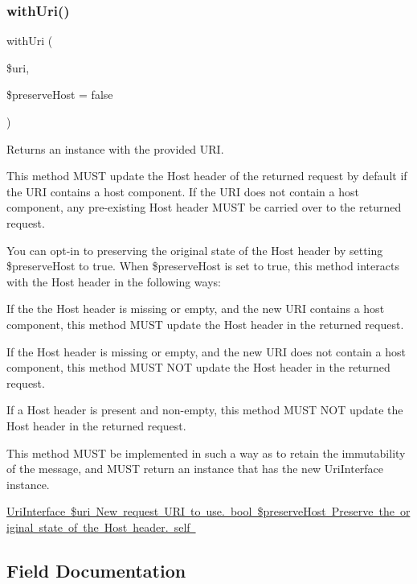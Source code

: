 \subsubsection{\texorpdfstring{with\+Uri()}{withUri()}}
{\footnotesize\ttfamily with\+Uri (\begin{DoxyParamCaption}\item[{Uri\+Interface}]{\$uri,  }\item[{}]{\$preserve\+Host = {\ttfamily false} }\end{DoxyParamCaption})}

Returns an instance with the provided U\+RI.

This method M\+U\+ST update the Host header of the returned request by default if the U\+RI contains a host component. If the U\+RI does not contain a host component, any pre-\/existing Host header M\+U\+ST be carried over to the returned request.

You can opt-\/in to preserving the original state of the Host header by setting {\ttfamily \$preserve\+Host} to {\ttfamily true}. When {\ttfamily \$preserve\+Host} is set to {\ttfamily true}, this method interacts with the Host header in the following ways\+:


\begin{DoxyItemize}
\item If the the Host header is missing or empty, and the new U\+RI contains a host component, this method M\+U\+ST update the Host header in the returned request.
\item If the Host header is missing or empty, and the new U\+RI does not contain a host component, this method M\+U\+ST N\+OT update the Host header in the returned request.
\item If a Host header is present and non-\/empty, this method M\+U\+ST N\+OT update the Host header in the returned request.
\end{DoxyItemize}

This method M\+U\+ST be implemented in such a way as to retain the immutability of the message, and M\+U\+ST return an instance that has the new Uri\+Interface instance.

\mbox{\hyperlink{}{Uri\+Interface \$uri New request U\+RI to use.  bool \$preserve\+Host Preserve the original state of the Host header.  self }}

\subsection{Field Documentation}
\mbox{\label{class_pes_1_1_http_1_1_request_aeb678b532c9dd148d3a4174d03c861e7}} 
